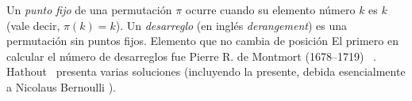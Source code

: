   Un \emph{punto fijo} de una permutación \(\pi\)%
  ocurre cuando su elemento número \(k\) es \(k\)
  (vale decir,
   \(\pi(k) = k\)).
  Un \emph{desarreglo}
  (en inglés \emph{\foreignlanguage{english}{derangement}})%
  es una permutación sin puntos fijos.
    {Elemento que no cambia de posición}
  El primero en calcular el número de desarreglos
  fue \foreignlanguage{french}{Pierre R. de Montmort}
  (1678--1719)~%
    \cite{montmort08:_jeux_hazard}.
  Hathout~%
    \cite{hathout03:_old_hats_probl, hathout04:_old_hats_probl_revis}
  presenta varias soluciones
  (incluyendo la presente,
   debida esencialmente a Nicolaus Bernoulli%
     ).

